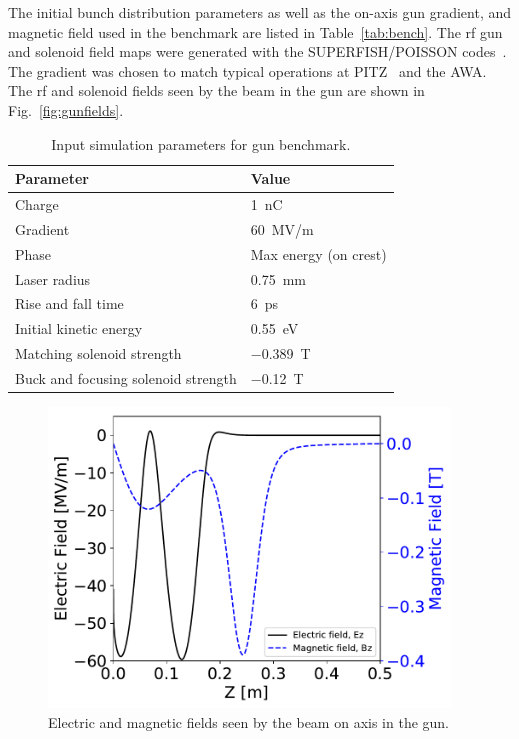 \documentclass{iitthesis}
\begin{document}
The initial bunch distribution parameters as well as the 
on-axis gun gradient, and magnetic field used in 
the benchmark are listed in Table~\ref{tab:bench}. 
The rf gun and solenoid field maps were generated 
with the SUPERFISH/POISSON  codes~\cite{superfish}.
The gradient was chosen to match typical operations at PITZ~\cite{pitz}
and the AWA. The rf and solenoid fields seen by the beam in the gun are shown in Fig.~\ref{fig:gunfields}.
\begin{table}
	\begin{center}
		\begin{tabular}{l l} 
			\toprule
			\textbf{Parameter} & \textbf{Value} \\ 
			\midrule
			Charge & \SI{1}{nC} \\
			\addlinespace[-1em] 
			Gradient & \SI{60}{MV/m} \\
			\addlinespace[-1em] 
			Phase & Max energy (on crest) \\
			\addlinespace[-1em] 
			Laser radius & \SI{0.75}{mm} \\
			\addlinespace[-1em] 
			Rise and fall time & \SI{6}{ps} \\
			\addlinespace[-1em] 
			Initial kinetic energy & \SI{0.55}{eV} \\
			\addlinespace[-1em] 
			Matching solenoid strength & \SI{-0.389}{T} \\
			\addlinespace[-1em] 
			Buck and focusing solenoid strength & \SI{-0.12}{T} \\
			\bottomrule			
		\end{tabular}
	\end{center}
	\caption{Input simulation parameters for gun benchmark.}
\end{table}\label{tab:bench}
\begin{figure}
	\begin{center}
		\includegraphics[width=0.95\textwidth]{images/gun_EM_fields}\caption{Electric and magnetic fields seen by the beam on axis in the gun.}
	\end{center}
\end{figure}\label{fig:gunfields}
\end{document}
